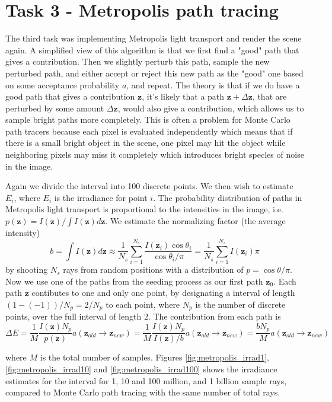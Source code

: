 \section*{Task 3 - Metropolis path tracing}
The third task was implementing Metropolis light transport and render the scene again. A simplified view of this algorithm is that we first find a "good" path that gives a contribution. Then we slightly perturb this path, sample the new perturbed path, and either accept or reject this new path as the "good" one based on some acceptance probability $a$, and repeat. The theory is that if we do have a good path that gives a contribution $\mathbf{z}$, it's likely that a path $\mathbf{z}+\Delta \mathbf{z}$, that are perturbed by some amount $\Delta \mathbf{z}$, would also give a contribution, which allows us to sample bright paths more completely. This is often a problem for Monte Carlo path tracers because each pixel is evaluated independently which means that if there is a small bright object in the scene, one pixel may hit the object while neighboring pixels may miss it completely which introduces bright specles of noise in the image. 

Again we divide the interval into 100 discrete points. We then wish to estimate $E_i$, where $E_i$ is the irradiance for point $i$. The probability distribution of paths in Metropolis light transport is proportional to the intensities in the image, i.e. $p(\mathbf{z}) = I(\mathbf{z})/{\int I(\mathbf{z})d\mathbf{z}}$. We estimate the normalizing factor (the average intensity) 
$$
b=\int I(\mathbf{z})d\mathbf{z}\approx \frac{1}{N_s}\sum_{i=1}^{N_s} \frac{I(\mathbf{z}_i) \cos \theta_i}{\cos \theta_i/\pi} = \frac{1}{N_s}\sum_{i=1}^{N_s} I(\mathbf{z}_i)\pi
$$
by shooting $N_s$ rays from random positions with a distribution of $p = \cos \theta/\pi$. Now we use one of the paths from the seeding process as our first path $\mathbf{z}_0$. Each path $\mathbf{z}$ contibutes to one and only one point, by designating a interval of length $(1- (-1))/N_p=2/N_p$ to each point, where $N_p$ is the number of discrete points, over the full interval of length $2$. The contribution from each path is 
$$\Delta E = \frac{1}{M} \frac{I(\mathbf{z})N_p}{p(\mathbf{z})}a(\mathbf{z}_{old}\to \mathbf{z}_{new}) = \frac{1}{M} \frac{I(\mathbf{z})N_p}{I(\mathbf{z})/b} a(\mathbf{z}_{old}\to \mathbf{z}_{new}) = \frac{bN_p}{M} a(\mathbf{z}_{old}\to \mathbf{z}_{new})$$ 

where $M$ is the total number of samples. Figures \ref{fig:metropolis_irrad1}, \ref{fig:metropolis_irrad10} and \ref{fig:metropolis_irrad100} shows the irradiance estimates for the interval for 1, 10 and 100 million, and 1 billion sample rays, compared to Monte Carlo path tracing with the same number of total rays.

